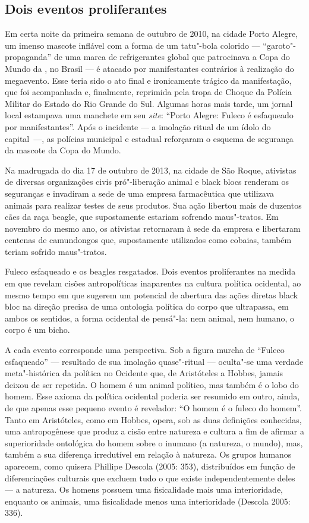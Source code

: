 \subsection{Dois eventos proliferantes}

Em certa noite da primeira semana
de outubro de 2010, na cidade Porto Alegre, um imenso mascote inflável
com a forma de um tatu"-bola colorido --- ``garoto"-propaganda'' de uma
marca de refrigerantes global que patrocinava a Copa do Mundo da ,
no Brasil --- é atacado por manifestantes contrários à realização do
megaevento. Esse teria sido o ato final e ironicamente trágico da
manifestação, que foi acompanhada e, finalmente, reprimida pela tropa de
Choque da Polícia Militar do Estado do Rio Grande do Sul. Algumas horas
mais tarde, um jornal local estampava uma manchete em seu \emph{site}:
``Porto Alegre: Fuleco é esfaqueado por manifestantes''. Após o
incidente --- a imolação ritual de um ídolo do capital~---, as polícias
municipal e estadual reforçaram o esquema de segurança da mascote da
Copa do Mundo.

Na madrugada do dia 17 de outubro de 2013, na cidade de São Roque,
ativistas de diversas organizações civis pró"-liberação animal e black
blocs renderam os seguranças e invadiram a sede de uma empresa
farmacêutica que utilizava animais para realizar testes de seus
produtos. Sua ação libertou mais de duzentos cães da raça beagle,
que supostamente estariam sofrendo maus"-tratos. Em novembro do mesmo
ano, os ativistas retornaram à sede da empresa e libertaram centenas de
camundongos que, supostamente utilizados como cobaias, também teriam
sofrido maus"-tratos.

Fuleco esfaqueado e os beagles resgatados. Dois eventos
proliferantes na medida em que revelam cisões antropolíticas inaparentes
na cultura política ocidental, ao mesmo tempo em que sugerem um
potencial de abertura das ações diretas black bloc na direção precisa de
uma ontologia política do corpo que ultrapassa, em ambos os sentidos, a
forma ocidental de pensá"-la: nem animal, nem humano, o corpo é um bicho.

A cada evento corresponde uma perspectiva. Sob a figura murcha de
``Fuleco esfaqueado'' --- resultado de sua imolação quase"-ritual ---
oculta"-se uma verdade meta"-histórica da política no Ocidente que, de
Aristóteles a Hobbes, jamais deixou de ser repetida. O homem é um animal
político, mas também é o lobo do homem. Esse axioma da política
ocidental poderia ser resumido em outro, ainda, de que apenas esse
pequeno evento é revelador: ``O homem é o fuleco do homem''. Tanto em
Aristóteles, como em Hobbes, opera, sob as duas definições conhecidas,
uma antropogênese que produz a cisão entre natureza e cultura a fim de
afirmar a superioridade ontológica do homem sobre o inumano (a natureza,
o mundo), mas, também a sua diferença irredutível em relação à natureza.
Os grupos humanos aparecem, como quisera Phillipe Descola (2005: 353),
distribuídos em função de diferenciações culturais que excluem tudo o
que existe independentemente deles --- a natureza. Os homens possuem uma
fisicalidade mais uma interioridade, enquanto os animais, uma
fisicalidade menos uma interioridade (Descola 2005: 336).

